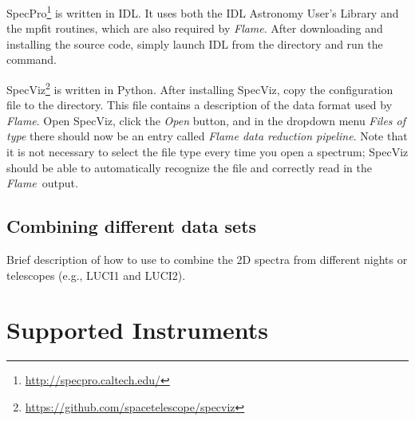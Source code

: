 \documentclass[a4paper]{article}
\newcommand{\flame}{\emph{Flame}}
\begin{document}
\begin{sloppypar}
SpecPro\footnote{\url{http://specpro.caltech.edu/}} is written in IDL. It uses both the IDL Astronomy User's Library and the mpfit routines, which are also required by \flame. After downloading and installing the source code, simply launch IDL from the  directory and run the  command.

SpecViz\footnote{\url{https://github.com/spacetelescope/specviz}} is written in Python. After installing SpecViz, copy the configuration file  to the  directory. This file contains a description of the data format used by \flame. Open SpecViz, click the \emph{Open} button, and in the dropdown menu \emph{Files of type} there should now be an entry called \emph{Flame data reduction pipeline}. Note that it is not necessary to select the file type every time you open a spectrum; SpecViz should be able to automatically recognize the file and correctly read in the \flame\ output.


\subsection{Combining different data sets}

Brief description of how to use  to combine the 2D spectra from different nights or telescopes (e.g., LUCI1 and LUCI2).






\section{Supported Instruments}
\label{sec:instruments}


\end{sloppypar}
\end{document}
